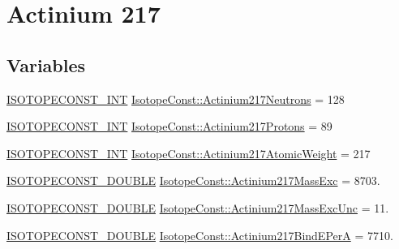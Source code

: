 \hypertarget{group___isotope_const-_actinium-_ac217}{}\section{Actinium 217}
\label{group___isotope_const-_actinium-_ac217}
\subsection*{Variables}
\begin{DoxyCompactItemize}
\item 
\mbox{\hyperlink{group___isotope_const-_macros_ga5f18360b3e99483a35c32d789e62621c}{I\+S\+O\+T\+O\+P\+E\+C\+O\+N\+S\+T\+\_\+\+I\+NT}} \mbox{\hyperlink{group___isotope_const-_actinium-_ac217_ga6194852b9ce43e8ef6b7cd1f2708b70a}{Isotope\+Const\+::\+Actinium217\+Neutrons}} = 128
\item 
\mbox{\hyperlink{group___isotope_const-_macros_ga5f18360b3e99483a35c32d789e62621c}{I\+S\+O\+T\+O\+P\+E\+C\+O\+N\+S\+T\+\_\+\+I\+NT}} \mbox{\hyperlink{group___isotope_const-_actinium-_ac217_gac6430f0ad22d12a58905352e18368d75}{Isotope\+Const\+::\+Actinium217\+Protons}} = 89
\item 
\mbox{\hyperlink{group___isotope_const-_macros_ga5f18360b3e99483a35c32d789e62621c}{I\+S\+O\+T\+O\+P\+E\+C\+O\+N\+S\+T\+\_\+\+I\+NT}} \mbox{\hyperlink{group___isotope_const-_actinium-_ac217_ga96cb686adbbccf5cbf64eb01ada67fd0}{Isotope\+Const\+::\+Actinium217\+Atomic\+Weight}} = 217
\item 
\mbox{\hyperlink{group___isotope_const-_macros_ga8f45a7272ce02c0b4c65c44636ed719a}{I\+S\+O\+T\+O\+P\+E\+C\+O\+N\+S\+T\+\_\+\+D\+O\+U\+B\+LE}} \mbox{\hyperlink{group___isotope_const-_actinium-_ac217_ga0fed33436ca1507c7745237a013d72b6}{Isotope\+Const\+::\+Actinium217\+Mass\+Exc}} = 8703.
\item 
\mbox{\hyperlink{group___isotope_const-_macros_ga8f45a7272ce02c0b4c65c44636ed719a}{I\+S\+O\+T\+O\+P\+E\+C\+O\+N\+S\+T\+\_\+\+D\+O\+U\+B\+LE}} \mbox{\hyperlink{group___isotope_const-_actinium-_ac217_gac51de704589221f76ec081cd29072513}{Isotope\+Const\+::\+Actinium217\+Mass\+Exc\+Unc}} = 11.
\item 
\mbox{\hyperlink{group___isotope_const-_macros_ga8f45a7272ce02c0b4c65c44636ed719a}{I\+S\+O\+T\+O\+P\+E\+C\+O\+N\+S\+T\+\_\+\+D\+O\+U\+B\+LE}} \mbox{\hyperlink{group___isotope_const-_actinium-_ac217_ga7600cba74cb709f912eac9a14d86f02f}{Isotope\+Const\+::\+Actinium217\+Bind\+E\+PerA}} = 7710.
\item 

\end{DoxyCompactItemize}

